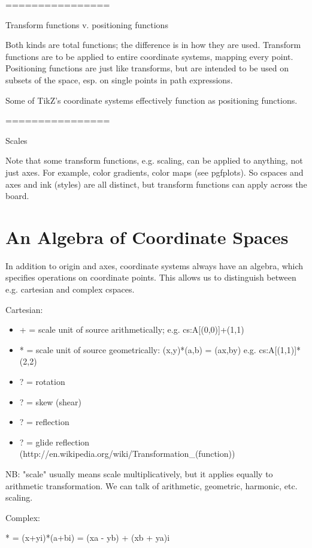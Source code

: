 \documentclass{tufte-handout}
\numberwithin{equation}{subsection}
\begin{document}
================

Transform functions v. positioning functions

Both kinds are total functions; the difference is in how they are
used.  Transform functions are to be applied to entire coordinate
systems, mapping every point.  Positioning functions are just like
transforms, but are intended to be used on subsets of the space,
esp. on single points in path expressions.

Some of TikZ's coordinate systems effectively function as positioning functions.

================

Scales

Note that some transform functions, e.g. scaling, can be applied to
anything, not just axes.  For example, color gradients, color maps
(see pgfplots).  So cspaces and axes and ink (styles) are all
distinct, but transform functions can apply across the board.

\section{An Algebra of Coordinate Spaces}
\label{sec:csalgebra}


In addition to origin and axes, coordinate systems always have an
algebra, which specifies operations on coordinate points.  This allows
us to distinguish between e.g. cartesian and complex cspaces.

Cartesian:

\begin{itemize}
\item +  =  scale unit of source arithmetically; e.g. cs:A[(0,0)]+(1,1)
\item *  =  scale unit of source geometrically: (x,y)*(a,b) = (ax,by) e.g. cs:A[(1,1)]*(2,2) 
\item ?  =  rotation
\item ?  =  skew (shear)
\item ?  =  reflection
\item ?  =  glide reflection (http://en.wikipedia.org/wiki/Transformation\_(function))
\end{itemize}

NB: "scale" usually means scale multiplicatively, but it applies
equally to arithmetic transformation.  We can talk of arithmetic,
geometric, harmonic, etc. scaling.

Complex:

* = (x+yi)*(a+bi) = (xa - yb) + (xb + ya)i
\end{document}
